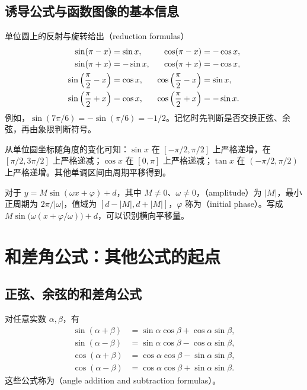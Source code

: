 \documentclass[UTF8]{ctexart}
\begin{document}
\subsection{诱导公式与函数图像的基本信息}

单位圆上的反射与旋转给出（reduction formulas）
\begin{align}
  \sin(\pi-x)&=\sin x,&\cos(\pi-x)&=-\cos x,\label{eq:trig-supplement}\\
  \sin(\pi+x)&=-\sin x,&\cos(\pi+x)&=-\cos x,\notag\\
  \sin\left(\frac\pi2-x\right)&=\cos x,&
  \cos\left(\frac\pi2-x\right)&=\sin x,\notag\\
  \sin\left(\frac\pi2+x\right)&=\cos x,&
  \cos\left(\frac\pi2+x\right)&=-\sin x.\notag
\end{align}
例如，$\sin(7\pi/6)=-\sin(\pi/6)=-1/2$。记忆时先判断是否交换正弦、余弦，再由象限判断符号。

从单位圆坐标随角度的变化可知：$\sin x$ 在 $[-\pi/2,\pi/2]$ 上严格递增，在 $[\pi/2,3\pi/2]$ 上严格递减；$\cos x$ 在 $[0,\pi]$ 上严格递减；$\tan x$ 在 $(-\pi/2,\pi/2)$ 上严格递增。其他单调区间由周期平移得到。

对于 $y=M\sin(\omega x+\varphi)+d$，其中 $M\ne0$、$\omega\ne0$，（amplitude）为 $|M|$，最小正周期为 $2\pi/|\omega|$，值域为 $[d-|M|,d+|M|]$，$\varphi$ 称为（initial phase）。写成 $M\sin\bigl(\omega(x+\varphi/\omega)\bigr)+d$，可以识别横向平移量。

\section{和差角公式：其他公式的起点}
\label{sec:trig-addition}

\subsection{正弦、余弦的和差角公式}

\begin{theorem}[和差角公式]
对任意实数 $\alpha,\beta$，有
\begin{align}
  \sin(\alpha+\beta)&=\sin\alpha\cos\beta+\cos\alpha\sin\beta,\label{eq:trig-sin-add}\\
  \sin(\alpha-\beta)&=\sin\alpha\cos\beta-\cos\alpha\sin\beta,\label{eq:trig-sin-sub}\\
  \cos(\alpha+\beta)&=\cos\alpha\cos\beta-\sin\alpha\sin\beta,\label{eq:trig-cos-add}\\
  \cos(\alpha-\beta)&=\cos\alpha\cos\beta+\sin\alpha\sin\beta.\label{eq:trig-cos-sub}
\end{align}
这些公式称为（angle addition and subtraction formulas）。
\end{theorem}
\end{document}
